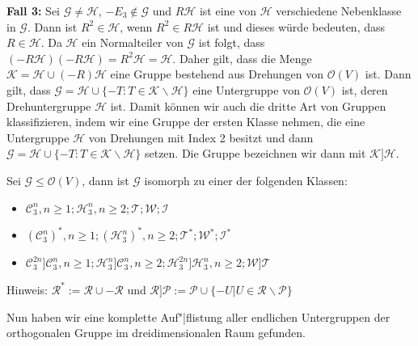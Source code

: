  \textbf{Fall 3:} Sei $\mathcal{G}\neq \mathcal{H}$, $-E_3 \notin \mathcal{G}$ und $R\mathcal{H}$ ist eine von $\mathcal{H}$ verschiedene Nebenklasse in $\mathcal{G}$. Dann ist $R^2\in\mathcal{H}$, wenn $R^2 \in R \mathcal{H}$ ist und dieses würde bedeuten, dass $R \in \mathcal{H}$. Da $\mathcal{H}$ ein Normalteiler von $\mathcal{G}$ ist folgt, dass $(-R\mathcal{H})(-R\mathcal{H})=R^2\mathcal{H}=\mathcal{H}$. Daher gilt, dass die Menge $\mathcal{K} = \mathcal{H} \cup (-R)\mathcal{H}$ eine Gruppe bestehend aus Drehungen von $\mathcal{O}(V)$ ist. Dann gilt, dass $\mathcal{G} = \mathcal{H} \cup \{-T:T\in\mathcal{K}\backslash\mathcal{H}\}$ eine Untergruppe von $\mathcal{O}(V)$ ist, deren Drehuntergruppe $\mathcal{H}$ ist. Damit können wir auch die dritte Art von Gruppen klassifizieren, indem wir eine Gruppe der ersten Klasse nehmen, die eine Untergruppe $\mathcal{H}$ von Drehungen mit Index 2 besitzt und dann $\mathcal{G}=\mathcal{H}\cup\{-T:T\in\mathcal{K}\backslash\mathcal{H}\}$ setzen. Die Gruppe bezeichnen wir dann mit $\mathcal{K}]\mathcal{H}$.


\begin{theorem}
 Sei $\mathcal{G}\leq\mathcal{O}(V)$, dann ist $\mathcal{G}$ isomorph zu einer der folgenden Klassen:
 \begin{itemize}
  \item $\mathcal{C}^n_3,n\geq1;\mathcal{H}^n_3,n\geq2;\mathcal{T};\mathcal{W};\mathcal{I}$
  \item $(\mathcal{C}^n_3)^*,n\geq1;(\mathcal{H}^n_3)^*,n\geq 2;\mathcal{T}^*;\mathcal{W}^*;\mathcal{I}^*$
  \item $\mathcal{C}^{2n}_3]\mathcal{C}^n_3,n\geq1;\mathcal{H}^n_3]\mathcal{C}^n_3,n\geq 2;\mathcal{H}^{2n}_3]\mathcal{H}^n_3,n\geq2;\mathcal{W}]\mathcal{T}$
\end{itemize}
Hinweis: $\mathcal{R}^*:=\mathcal{R}\cup -\mathcal{R}$ und $\mathcal{R}]\mathcal{P}:=\mathcal{P}\cup \{-U|U\in \mathcal{R} \backslash \mathcal{P} \}$
\end{theorem}
Nun haben wir eine komplette Auf"|flistung aller endlichen Untergruppen der orthogonalen Gruppe im dreidimensionalen Raum gefunden.
